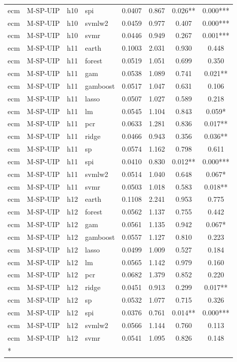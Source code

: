 \begin{ThreePartTable}
\begin{longtable}[t]{llclcccc}
ecm & M-SP-UIP & h10 & spi & 0.0407 & 0.867 & 0.026** & 0.000***\\
ecm & M-SP-UIP & h10 & svmlw2 & 0.0459 & 0.977 & 0.407 & 0.000***\\
ecm & M-SP-UIP & h10 & svmr & 0.0446 & 0.949 & 0.267 & 0.001***\\
\addlinespace
ecm & M-SP-UIP & h11 & earth & 0.1003 & 2.031 & 0.930 & 0.448\\
ecm & M-SP-UIP & h11 & forest & 0.0519 & 1.051 & 0.699 & 0.350\\
ecm & M-SP-UIP & h11 & gam & 0.0538 & 1.089 & 0.741 & 0.021**\\
ecm & M-SP-UIP & h11 & gamboost & 0.0517 & 1.047 & 0.631 & 0.106\\
ecm & M-SP-UIP & h11 & lasso & 0.0507 & 1.027 & 0.589 & 0.218\\
ecm & M-SP-UIP & h11 & lm & 0.0545 & 1.104 & 0.843 & 0.059*\\
ecm & M-SP-UIP & h11 & pcr & 0.0633 & 1.281 & 0.836 & 0.017**\\
ecm & M-SP-UIP & h11 & ridge & 0.0466 & 0.943 & 0.356 & 0.036**\\
ecm & M-SP-UIP & h11 & sp & 0.0574 & 1.162 & 0.798 & 0.611\\
ecm & M-SP-UIP & h11 & spi & 0.0410 & 0.830 & 0.012** & 0.000***\\
ecm & M-SP-UIP & h11 & svmlw2 & 0.0514 & 1.040 & 0.648 & 0.067*\\
ecm & M-SP-UIP & h11 & svmr & 0.0503 & 1.018 & 0.583 & 0.018**\\
\addlinespace
ecm & M-SP-UIP & h12 & earth & 0.1108 & 2.241 & 0.953 & 0.775\\
ecm & M-SP-UIP & h12 & forest & 0.0562 & 1.137 & 0.755 & 0.442\\
ecm & M-SP-UIP & h12 & gam & 0.0561 & 1.135 & 0.942 & 0.067*\\
ecm & M-SP-UIP & h12 & gamboost & 0.0557 & 1.127 & 0.810 & 0.223\\
ecm & M-SP-UIP & h12 & lasso & 0.0499 & 1.009 & 0.527 & 0.184\\
ecm & M-SP-UIP & h12 & lm & 0.0565 & 1.142 & 0.979 & 0.160\\
ecm & M-SP-UIP & h12 & pcr & 0.0682 & 1.379 & 0.852 & 0.220\\
ecm & M-SP-UIP & h12 & ridge & 0.0451 & 0.913 & 0.299 & 0.017**\\
ecm & M-SP-UIP & h12 & sp & 0.0532 & 1.077 & 0.715 & 0.326\\
ecm & M-SP-UIP & h12 & spi & 0.0376 & 0.761 & 0.014** & 0.000***\\
ecm & M-SP-UIP & h12 & svmlw2 & 0.0566 & 1.144 & 0.760 & 0.113\\
ecm & M-SP-UIP & h12 & svmr & 0.0541 & 1.095 & 0.826 & 0.148\\*
\end{longtable}
\end{ThreePartTable}
\endgroup{}

